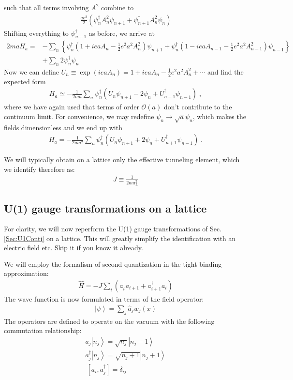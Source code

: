 \documentclass[10pt]{article}
\newcommand{\ket}[1]{\ensuremath{\left|#1\right\rangle}}
\begin{document}
such that all terms involving $A^2$ combine to
\begin{align}
\frac{ae^2}{2} \left(\psi_n^\dagger A_n^2 \psi_{n+1} + \psi_{n+1}^\dagger A_n^2 \psi_n\right)
\end{align}
Shifting everything to $\psi_{n+1}^\dagger$ as before, we arrive at
\begin{eqnarray}
2ma H_a = &-\sum_n \left\lbrace \psi_n^\dagger \left(1 + iea A_n -\frac{1}{2} e^2 a^2 A_n^2\right) \psi_{n+1} + \psi_n^\dagger \left(1-ieaA_{n-1} - \frac{1}{2}e^2 a^2 A_{n-1}^2\right)\psi_{n-1} \right\rbrace \nonumber\\
&+ \sum_n 2\psi_n^\dagger \psi_n
\end{eqnarray}
Now we can define $U_n \equiv \exp \left(iea A_n\right) = 1 + iea A_n - \frac{1}{2}e^2 a^2 A_n^2 + \cdots$ and find the expected form
\begin{align}
H_a \simeq -\frac{1}{2ma}\sum_n  \psi_n^\dagger \left(U_n \psi_{n+1} - 2\psi_n + U_{n-1}^\dagger \psi_{n-1} \right) \; ,
\end{align}
where we have again used that terms of order $\mathcal{O}(a)$ don't contribute to the continuum limit. For convenience, we may redefine $\psi_n \rightarrow \sqrt{a} \psi_n$, which makes the fields dimensionless and we end up with
\begin{align}
H_a = -\frac{1}{2ma^2}\sum_n  \psi_n^\dagger\left(U_n \psi_{n+1} + 2\psi_n + U_{n+1}^\dagger \psi_{n-1}\right)\; .
\end{align}

We will typically obtain on a lattice only the effective tunneling element, which we identify therefore as:
\begin{align}
J \equiv \frac{1}{2m a_L^2}
\end{align}


\subsection{U(1) gauge transformations on a lattice}

For clarity, we will now reperform the U(1) gauge transformations of Sec. \ref{Sec:U1Conti} on a lattice.  This will greatly simplify the identification with an electric field etc. Skip it if you know it already.

We will employ  the formalism of second quantization in the tight binding approximation:
\begin{align}
\hat{H} = - J \sum_i \left(a_i^\dag a_{i+1} +a_{i+1}^\dag a_i \right)
\end{align}
The wave function is now formulated in terms of the field operator:
\begin{align}
\ket{\psi} = \sum_j \hat{a}_j w_j(x)
\end{align}
The operators are defined to operate on the vacuum with the following commutation relationship:
\begin{eqnarray}
a_j \ket{n_j} = \sqrt{n_j}\ket{n_j-1}\\
a_j^\dag \ket{n_j} = \sqrt{n_j+1}\ket{n_j+1}\\
~[a_i,a_j^\dag] = \delta_{ij}
\end{eqnarray}
\end{document}

